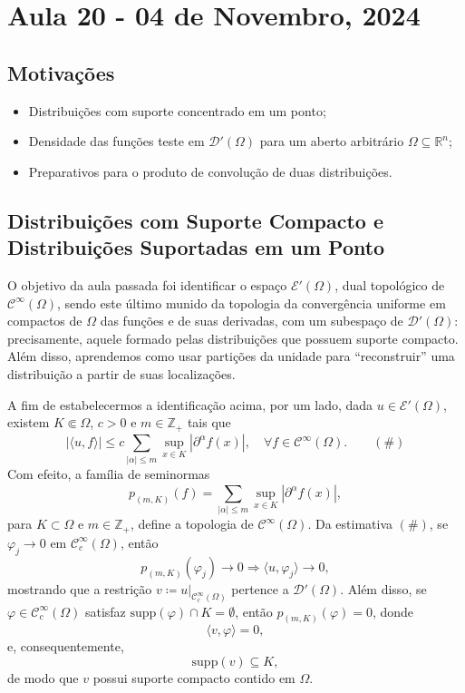 \documentclass[../distribution_theory_notes.tex]{subfiles}
\begin{document}
\section{Aula 20 - 04 de Novembro, 2024}
\subsection{Motivações}
\begin{itemize}
	\item Distribuições com suporte concentrado em um ponto;
	\item Densidade das funções teste em \(\mathcal{D}'(\Omega )\) para um aberto arbitrário \(\Omega \subseteq \mathbb{R}^{n}\);
	\item Preparativos para o produto de convolução de duas distribuições.
\end{itemize}

\subsection{Distribuições com Suporte Compacto e Distribuições Suportadas em um Ponto}
O objetivo da aula passada foi identificar o espaço \(\mathcal{E}'(\Omega )\), dual topológico de \(\mathcal{C}^{\infty}(\Omega )\), sendo este último munido da topologia da convergência uniforme em compactos de \(\Omega \) das funções e de suas derivadas, com um subespaço de \(\mathcal{D}'(\Omega )\): precisamente, aquele formado pelas distribuições que possuem suporte compacto. Além disso, aprendemos como usar partições da unidade para ``reconstruir'' uma distribuição a partir de suas localizações.

A fim de estabelecermos a identificação acima, por um lado, dada \(u\in \mathcal{E}'(\Omega )\), existem \(K\Subset \Omega \), \(c>0\) e \(m\in \mathbb{Z}_{+}\) tais que
\[
	|\langle u, f \rangle |\leq c\sum\limits_{|\alpha |\leq m}^{}\sup_{x\in K}|\partial^{\alpha }f(x)|,\quad \forall f\in \mathcal{C}^{\infty}(\Omega ). \qquad (\#)
\]
Com efeito, a família de seminormas
\[
	p_{(m,K)}(f)=\sum\limits_{|\alpha |\leq m}^{}\sup_{x\in K}|\partial^{\alpha }f(x)|,
\]
para \(K\subset \Omega \) e \(m\in \mathbb{Z}_{+}\), define a topologia de \(\mathcal{C}^{\infty}(\Omega )\). Da estimativa \((\#)\), se \(\varphi_{j}\to 0\) em \(\mathcal{C}_{c}^{\infty}(\Omega )\), então
\[
	p_{(m,K)}(\varphi_{j})\to 0 \Rightarrow \langle u, \varphi_{j} \rangle\to 0,
\]
mostrando que a restrição \(v\coloneqq u|_{\mathcal{C}_{c}^{\infty}(\Omega )}\) pertence a \(\mathcal{D}'(\Omega )\). Além disso, se \(\varphi \in \mathcal{C}_{c}^{\infty}(\Omega )\) satisfaz \(\mathrm{supp}(\varphi )\cap K=\emptyset \), então \(p_{(m,K)}(\varphi )=0\), donde
\[
	\langle v, \varphi  \rangle=0,
\]
e, consequentemente,
\[
	\mathrm{supp}(v)\subseteq K,
\]
de modo que \(v\) possui suporte compacto contido em \(\Omega \).
\end{document}
